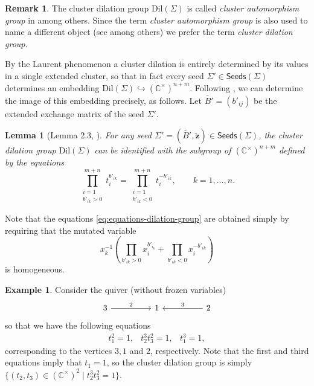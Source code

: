 \documentclass{amsart}
\newcommand{\seed}{\Sigma}
\newcommand{\excluster}[1]{\widetilde{\mathbf{#1}}}
\newcommand{\exmatrix}[1]{\widetilde{#1}}
\newcommand{\C}{\mathbb{C}}
\newcommand{\seeds}{\mathsf{Seeds}}
\numberwithin{equation}{section}
\newtheorem{lemma}[theorem]{Lemma}
\theoremstyle{definition}
\newtheorem{remark}[theorem]{Remark}
\newtheorem{example}[theorem]{Example}
\newcommand{\dil}{\mathrm{Dil}}
\newcommand{\mult}{\mathsf{mult}}
\begin{document}
\begin{remark}\label{rmk:terminology}
        The cluster dilation group $\dil(\seed)$ is called \emph{cluster automorphism group} in \cite{LSI, LSII, deep, GSV} among others. Since the term \emph{cluster automorphism group} is also used to name a different object (see \cite{cluster-auto, cluster-auto-2, cluster-iso-lawson, cluster-iso-cao} among others) we prefer the term \emph{cluster dilation group.} 
\end{remark}

By the Laurent phenomenon a cluster dilation is entirely determined by its values in a single extended cluster, so that in fact every seed $\seed' \in \seeds(\seed)$ determines an embedding $\dil(\seed) \hookrightarrow (\C^{\times})^{n+m}$. Following \cite{GSV}, we can determine the image of this embedding precisely, as follows. Let $\exmatrix{B'} = (b'_{ij})$ be the extended exchange matrix of the seed $\seed'$. %

\begin{lemma}[Lemma 2.3, \cite{GSV}]\label{lem:cluster-dilation-group} For any seed $\seed' = (\exmatrix{B'}, \excluster{z}) \in \seeds(\seed)$, the cluster dilation group $\dil(\seed)$ can be identified with the subgroup of $(\C^{\times})^{n+m}$ defined by the equations
\begin{equation}\label{eq:equations-dilation-group}
    \prod_{\substack{i = 1 \\ b'_{ik} > 0}}^{m+n}t_i^{b'_{ik}} = \prod_{\substack{i = 1 \\ b'_{ik} < 0}}^{m+n}t_i^{-b'_{ik}}, \qquad k = 1, \dots, n.
\end{equation}
\end{lemma}

Note that the equations \eqref{eq:equations-dilation-group} are obtained simply by requiring that the mutated variable \[x_k^{-1}\left(\prod_{b'_{ik}>0} x_i^{b'_{i_k}} + \prod_{b'_{ik}<0}x_i^{-b'_{ik}}\right)\] is homogeneous. 

\begin{example}\label{ex:dilation-group}
Consider the quiver (without frozen variables)
\[\begin{tikzcd}
	3 && 1 && 2
	\arrow["2", from=1-1, to=1-3]
	\arrow["3"', from=1-5, to=1-3]
\end{tikzcd}\]
so that we have the following equations
    \[\begin{array}{ccc}
    t_1^2 = 1, & t_2^3t_3^2 = 1, & t_1^3 = 1,      
    \end{array}
    \]
corresponding to the vertices $3, 1$ and $2$, respectively. Note that the first and third equations imply that $t_1 = 1$, so the cluster dilation group is simply $\{(t_2, t_3) \in (\C^{\times})^2 \mid t_2^3t_3^2 = 1\}$. 
\end{example}
\end{document}
